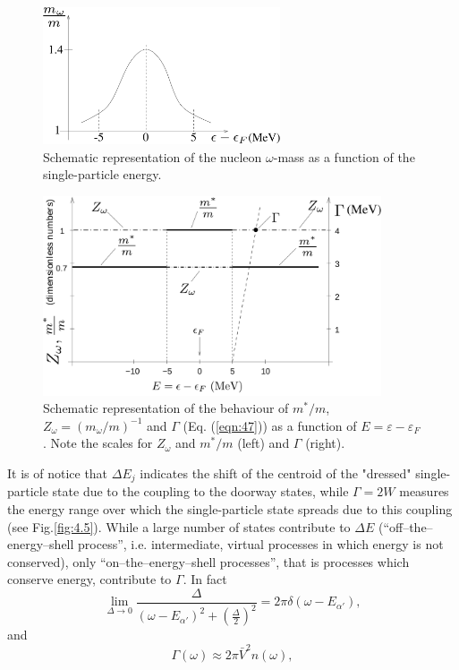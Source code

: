 \begin{figure}[h!]
\centerline {
\includegraphics*[width=7cm]{introduccion/figs/figintroD3}
}
\caption{Schematic representation of the nucleon $\omega$-mass as a function of the single-particle energy.}
\label{fig:4.3}
\end{figure}

\begin{figure}[h!]
\centerline {
\includegraphics*[width=10cm]{introduccion/figs/figintroD4}
}
\caption{Schematic representation of the behaviour of $m^*/m$, $Z_{\omega}=(m_{\omega}/m)^{-1}$ and $\Gamma$ (Eq. (\ref{eqn:47}))  as a function of $E = \varepsilon - \varepsilon_F$. Note the scales for $Z_\omega$ and $m^*/m$ (left) and $\Gamma$ (right).}
\label{fig:4.4}
\end{figure}


It is of notice that $\Delta E_j$ indicates the shift  of the  centroid of the "dressed" single-particle state due to the coupling to the  doorway states, while $\Gamma = 2W$ measures the energy range over which the single-particle state spreads due to this coupling (see Fig.\ref{fig:4.5}). While a large number of states contribute to $\Delta E$ (``off--the--energy--shell process'', i.e. intermediate, virtual processes in which energy is not conserved), only ``on--the--energy--shell processes'', that is processes which conserve  energy, contribute to $\Gamma$. In fact
\begin{equation}
\nonumber
\lim_{\Delta \rightarrow 0} \frac{\Delta}{(\omega -E_{\alpha'})^2 + \left( \frac{\Delta}{2} \right)^2} = 2\pi\delta(\omega-E_{\alpha'}) ,
\end{equation}
and
\begin{equation}
\Gamma(\omega) \approx 2\pi \bar{V}^2 n(\omega) ,
\label{eqn:41}
\end{equation}

